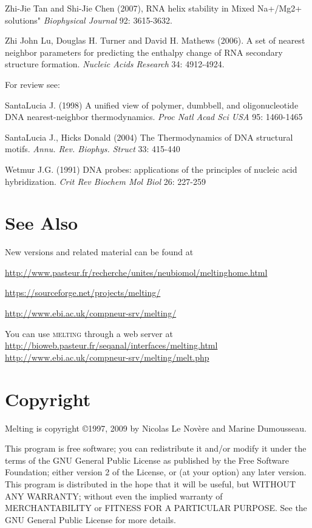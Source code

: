 \documentclass{article}
\begin{document}
Zhi-Jie Tan and Shi-Jie Chen (2007), RNA helix stability in Mixed Na+/Mg2+ solutions" 
\textit{Biophysical Journal} 92: 3615-3632.

Zhi John Lu, Douglas H. Turner and David H. Mathews (2006). A set of nearest neighbor 
parameters for predicting the enthalpy change of RNA secondary structure formation. 
\textit{Nucleic Acids Research} 34: 4912-4924. 

  For review see: 
  
  SantaLucia J. (1998) A unified view of polymer, dumbbell, and oligonucleotide 
DNA nearest-neighbor thermodynamics. \textit{Proc Natl Acad Sci USA}  95: 1460-1465 

SantaLucia  J., Hicks Donald (2004) The Thermodynamics of DNA structural motifs. 
\textit{Annu. Rev. Biophys. Struct} 33: 415-440 
  
  Wetmur J.G. (1991) DNA probes: applications of the principles of nucleic 
acid hybridization. \textit{Crit Rev Biochem Mol Biol} 26: 227-259   
 
\section{See Also }
New versions and 
related material can be found at 

\url{http://www.pasteur.fr/recherche/unites/neubiomol/meltinghome.html} 

\url{https://sourceforge.net/projects/melting/}

\url{http://www.ebi.ac.uk/compneur-srv/melting/}
  
You can use \textsc{melting} through a web server at 
\url{http://bioweb.pasteur.fr/seqanal/interfaces/melting.html}
\url{http://www.ebi.ac.uk/compneur-srv/melting/melt.php}   
   
\section{Copyright }
Melting is copyright 
\copyright 1997, 2009 by Nicolas Le Nov\`ere and Marine Dumousseau.  

This program is free software; 
you can redistribute it and/or modify it under the terms of the GNU General 
Public License as published by the Free Software Foundation; either version 
2 of the License, or (at your option) any later version.   
  This program 
is distributed in the hope that it will be useful, but WITHOUT ANY WARRANTY; 
without even the implied warranty of MERCHANTABILITY or FITNESS FOR A 
PARTICULAR PURPOSE.  See the GNU General Public License for more details. 
  
\end{document}
